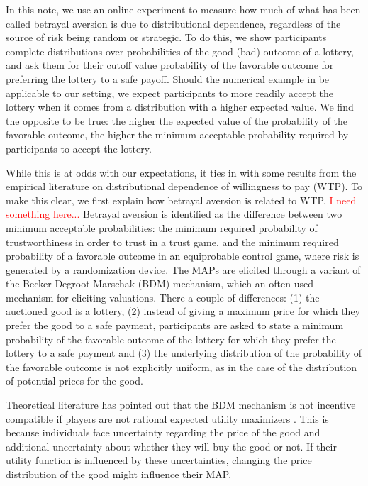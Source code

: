In this note, we use an online experiment to measure how much of what has been called betrayal aversion is due to distributional dependence, regardless of the source of risk being random or strategic.
To do this, we show participants complete distributions over probabilities of the good (bad) outcome of a lottery, and ask them for their cutoff value probability of the favorable outcome for preferring the lottery to a safe payoff.
Should the numerical example in \cite{Li2020a} be applicable to our setting, we expect participants to more readily accept the lottery when it comes from a distribution with a higher expected value.
We find the opposite to be true: the higher the expected value of the probability of the favorable outcome, the higher the minimum acceptable probability required by participants to accept the lottery.

While this is at odds with our expectations, it ties in with some results from the empirical literature on distributional dependence of willingness to pay (WTP).
To make this clear, we first explain how betrayal aversion is related to WTP.
\textcolor{red}{I need something here...}
Betrayal aversion is identified as the difference between two minimum acceptable probabilities: the minimum required probability of trustworthiness in order to trust in a trust game, and the minimum required probability of a favorable outcome in an equiprobable control game, where risk is generated by a randomization device.
The MAPs are elicited through a variant of the Becker-Degroot-Marschak (BDM) \citep{Becker1964} mechanism, which an often used mechanism for eliciting valuations.
There a couple of differences: (1) the auctioned good is a lottery, (2) instead of giving a maximum price for which they prefer the good to a safe payment, participants are asked to state a minimum probability of the favorable outcome of the lottery for which they prefer the lottery to a safe payment and (3) the underlying distribution of the probability of the favorable outcome is not explicitly uniform, as in the case of the distribution of potential prices for the good.

Theoretical literature has pointed out that the BDM mechanism is not incentive compatible if players are not rational expected utility maximizers \citep{Karni1987,Horowitz2006}.
This is because individuals face uncertainty regarding the price of the good and additional uncertainty about whether they will buy the good or not.
If their utility function is influenced by these uncertainties, changing the price distribution of the good might influence their MAP.

